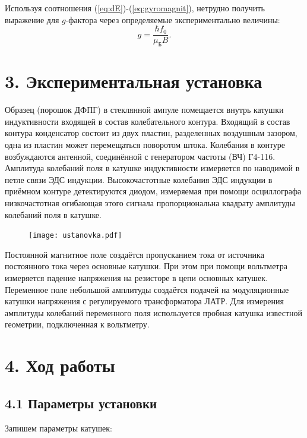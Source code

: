 \documentclass[a4paper,12pt]{report}
\begin{document}
	Используя соотношения (\ref{eq:dE})-(\ref{eq:gyromagnit}), нетрудно получить выражение для $g$-фактора через определяемые экспериментально величины:
	\begin{equation}
		\label{eq:g-faktor}
		\tag{$\star$}
		g = \frac{\hbar f_0}{\mu_\text{Б}B}.
	\end{equation}

\section*{3. Экспериментальная установка}
Образец (порошок ДФПГ) в стеклянной ампуле помещается внутрь катушки индуктивности входящей в состав колебательного контура. Входящий в состав контура конденсатор состоит из двух пластин, разделенных воздушным зазором, одна из пластин может перемещаться поворотом штока. Колебания в контуре возбуждаются антенной, соединённой с генератором частоты (ВЧ) Г4-116. Амплитуда колебаний поля в катушке индуктивности измеряется по наводимой в петле связи ЭДС индукции. Высокочастотные колебания ЭДС индукции в приёмном контуре детектируются диодом, измеряемая при помощи осциллографа низкочастотная огибающая этого сигнала пропорциональна квадрату амплитуды колебаний поля в катушке.
	\begin{figure}[h!]
		\begin{floatrow}
			{\texttt{[image: ustanovka.pdf]}}    
		\end{floatrow}
	\end{figure}
	
	Постоянной магнитное поле создаётся пропусканием тока от источника постоянного тока через основные катушки. При этом при помощи вольтметра измеряется падение напряжения на резисторе в цепи основных катушек. Переменное поле небольшой амплитуды создаётся подачей на модуляционные катушки напряжения с регулируемого трансформатора ЛАТР. Для измерения амплитуды колебаний переменного поля используется пробная катушка известной геометрии, подключенная к вольтметру.
	
\section*{4. Ход работы}
\subsection*{4.1 Параметры установки}
Запишем параметры катушек:
\end{document}
